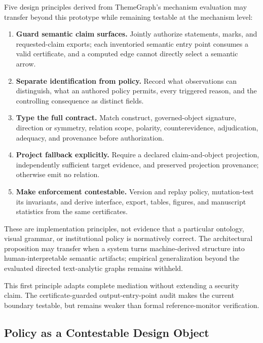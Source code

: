 \documentclass[manuscript,screen,review]{acmart}
\begin{document}
Five design principles derived from ThemeGraph's mechanism evaluation may transfer beyond this prototype while remaining testable at the mechanism level:
\begin{enumerate}
  \item \textbf{Guard semantic claim surfaces.} Jointly authorize statements, marks, and requested-claim exports; each inventoried semantic entry point consumes a valid certificate, and a computed edge cannot directly select a semantic arrow.
  \item \textbf{Separate identification from policy.} Record what observations can distinguish, what an authored policy permits, every triggered reason, and the controlling consequence as distinct fields.
  \item \textbf{Type the full contract.} Match construct, governed-object signature, direction or symmetry, relation scope, polarity, counterevidence, adjudication, adequacy, and provenance before authorization.
  \item \textbf{Project fallback explicitly.} Require a declared claim-and-object projection, independently sufficient target evidence, and preserved projection provenance; otherwise emit no relation.
  \item \textbf{Make enforcement contestable.} Version and replay policy, mutation-test its invariants, and derive interface, export, tables, figures, and manuscript statistics from the same certificates.
\end{enumerate}
These are implementation principles, not evidence that a particular ontology, visual grammar, or institutional policy is normatively correct. The architectural proposition may transfer when a system turns machine-derived structure into human-interpretable semantic artifacts; empirical generalization beyond the evaluated directed text-analytic graphs remains withheld.

This first principle adapts complete mediation without extending a security claim. The certificate-guarded output-entry-point audit makes the current boundary testable, but remains weaker than formal reference-monitor verification.

\subsection{Policy as a Contestable Design Object}
\end{document}
